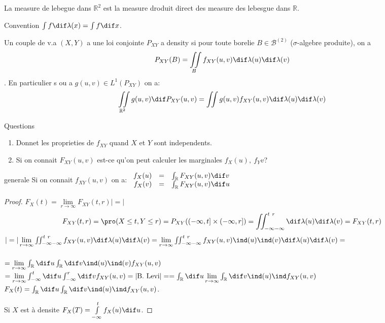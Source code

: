 \begin{definition}
	La measure de lebegue dans $\mathbb{R}^2$ est la measure droduit direct des measure des lebesgue dans $\mathbb{R}$.
\end{definition}

Convention $\int f\dif \lambda(x)=\int f \dif x$.

\begin{definition}
	Un couple de v.a $(X, Y)$ a une loi conjointe $P_{XY}$ a density si pour toute borelie $B\in\mathcal{B}^{(2)}$ ($\sigma$-algebre produite), on a
	$$P_{XY}(B)=\iint\limits_{B}f_{XY}(u, v)\dif\lambda(u)\dif\lambda(v)$$. En particulier s ou a $g(u,v)\in L^1(P_{XY})$ on a:
	$$\iint\limits_{\mathbb{R}^2}g(u, v)\dif P_{XY}(u, v)=\iint g(u,v) f_{XY}(u, v)\dif \lambda(u) \dif \lambda(v)$$
\end{definition}

Questions
\begin{enumerate}
	\item Donnet les proprieties de $f_{XY}$ quand $X$ et $Y$ sont independents.
	\item Si on connait $F_{XY}(u, v)$ est-ce qu'on peut calculer les marginales $f_X(u),\ f_Y{v}$?
\end{enumerate}

\begin{proposition}{generale}
	Si on connait $f_{XY}(u, v)$ on a:
	$\begin{array}{rrl}f_X(u) & = & \int_\mathbb{R}F_{XY}(u,v)\dif v\\ f_X(v) & = & \int_\mathbb{R}F_{XY}(u,v)\dif u\end{array}$
\end{proposition}
\begin{proof}
	$F_X(t)=\lim\limits_{r\rightarrow\infty}F_{XY}(t, r)|=|$\\
	$$F_{XY}(t,r)=\pro (X\leq t, Y\leq r)=P_{XY}((-\infty, t]\times(-\infty, r])=\iint_{-\infty -\infty}^{t\ r}\dif \lambda(u) \dif \lambda(v)=F_{XY}(t,r)$$
	$|=|\lim\limits_{r\rightarrow\infty}\iint_{-\infty -\infty}^{t\ r} f_{XY}(u, v)\dif \lambda(u) \dif \lambda(v)=\lim\limits_{r\rightarrow\infty}\iint_{-\infty -\infty}^{t\ r} f_{XY}(u, v)\ind (u)\ind (v)\dif \lambda(u) \dif \lambda(v)=$\\
	\\
	$=\lim\limits_{r\rightarrow\infty}\int_{\mathbb{R}} \dif u \int_{\mathbb{R}} \dif v \ind (u)\ind (v) f_{XY}(u, v)$
	$=\lim\limits_{r\rightarrow\infty}\int_{-\infty}^t \dif u \int_{-\infty}^r \dif v  f_{XY}(u, v) =|\text{B. Levi}|=
	=\int_{\mathbb{R}} \dif u \lim\limits_{r\rightarrow\infty} \int_{\mathbb{R}} \dif v \ind (u)\ind  f_{XY}(u, v)$
	$F_X(t)=\int_{\mathbb{R}} \dif u \int_{\mathbb{R}} \dif v \ind (u)\ind  f_{XY}(u, v)$.
	
	Si $X$ est à densite $F_X(T) = \int\limits_{-\infty}^t f_X(u) \dif u$.
\end{proof}


